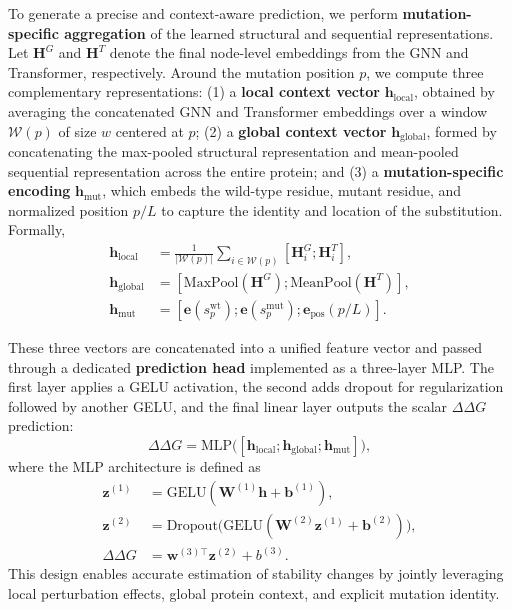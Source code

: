 \documentclass[11pt]{article}
\begin{document}
To generate a precise and context-aware prediction, we perform \textbf{mutation-specific aggregation} of the learned structural and sequential representations. Let $\mathbf{H}^G$ and $\mathbf{H}^T$ denote the final node-level embeddings from the GNN and Transformer, respectively. Around the mutation position $p$, we compute three complementary representations: (1) a \textbf{local context vector} $\mathbf{h}_{\text{local}}$, obtained by averaging the concatenated GNN and Transformer embeddings over a window $\mathcal{W}(p)$ of size $w$ centered at $p$; (2) a \textbf{global context vector} $\mathbf{h}_{\text{global}}$, formed by concatenating the max-pooled structural representation and mean-pooled sequential representation across the entire protein; and (3) a \textbf{mutation-specific encoding} $\mathbf{h}_{\text{mut}}$, which embeds the wild-type residue, mutant residue, and normalized position $p/L$ to capture the identity and location of the substitution. Formally,
\begin{align}
    \mathbf{h}_{\text{local}} &= \frac{1}{|\mathcal{W}(p)|} \sum_{i \in \mathcal{W}(p)} [\mathbf{H}^G_i; \mathbf{H}^T_i], \\
    \mathbf{h}_{\text{global}} &= [\text{MaxPool}(\mathbf{H}^G); \text{MeanPool}(\mathbf{H}^T)], \\
    \mathbf{h}_{\text{mut}} &= [\mathbf{e}(s_p^{\text{wt}}); \mathbf{e}(s_p^{\text{mut}}); \mathbf{e}_{\text{pos}}(p/L)].
\end{align}

These three vectors are concatenated into a unified feature vector and passed through a dedicated \textbf{prediction head} implemented as a three-layer MLP. The first layer applies a GELU activation, the second adds dropout for regularization followed by another GELU, and the final linear layer outputs the scalar $\Delta\Delta G$ prediction:
\begin{equation}
    \Delta \Delta G = \text{MLP}\big([\mathbf{h}_{\text{local}}; \mathbf{h}_{\text{global}}; \mathbf{h}_{\text{mut}}]\big),
\end{equation}
where the MLP architecture is defined as
\begin{align}
    \mathbf{z}^{(1)} &= \text{GELU}(\mathbf{W}^{(1)} \mathbf{h} + \mathbf{b}^{(1)}), \\
    \mathbf{z}^{(2)} &= \text{Dropout}\big(\text{GELU}(\mathbf{W}^{(2)} \mathbf{z}^{(1)} + \mathbf{b}^{(2)})\big), \\
    \Delta \Delta G &= \mathbf{w}^{(3)\top} \mathbf{z}^{(2)} + b^{(3)}.
\end{align}
This design enables accurate estimation of stability changes by jointly
leveraging local perturbation effects, global protein context, and explicit
mutation identity.
\end{document}
